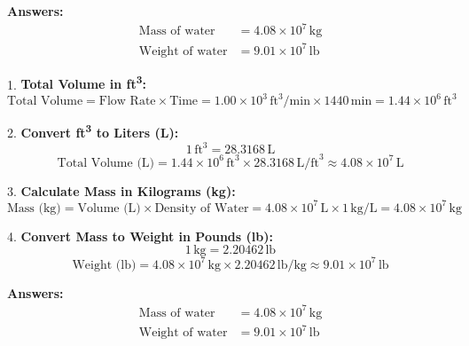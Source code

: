\documentclass[11pt]{article}
\begin{document}
\textbf{Answers:}
\begin{align*}
\text{Mass of water} &= 4.08 \times 10^7 \, \text{kg} \\
\text{Weight of water} &= 9.01 \times 10^7 \, \text{lb}
\end{align*}


1. \textbf{Total Volume in ft\textsuperscript{3}:}
\[
\text{Total Volume} = \text{Flow Rate} \times \text{Time} = 1.00 \times 10^3 \, \text{ft}^3/\text{min} \times 1440 \, \text{min} = 1.44 \times 10^6 \, \text{ft}^3
\]

2. \textbf{Convert ft\textsuperscript{3} to Liters (L):}
\[
1 \, \text{ft}^3 = 28.3168 \, \text{L}
\]
\[
\text{Total Volume (L)} = 1.44 \times 10^6 \, \text{ft}^3 \times 28.3168 \, \text{L/ft}^3 \approx 4.08 \times 10^7 \, \text{L}
\]

3. \textbf{Calculate Mass in Kilograms (kg):}
\[
\text{Mass (kg)} = \text{Volume (L)} \times \text{Density of Water} = 4.08 \times 10^7 \, \text{L} \times 1 \, \text{kg/L} = 4.08 \times 10^7 \, \text{kg}
\]

4. \textbf{Convert Mass to Weight in Pounds (lb):}
\[
1 \, \text{kg} = 2.20462 \, \text{lb}
\]
\[
\text{Weight (lb)} = 4.08 \times 10^7 \, \text{kg} \times 2.20462 \, \text{lb/kg} \approx 9.01 \times 10^7 \, \text{lb}
\]

\textbf{Answers:}
\begin{align*}
\text{Mass of water} &= 4.08 \times 10^7 \, \text{kg} \\
\text{Weight of water} &= 9.01 \times 10^7 \, \text{lb}
\end{align*}
\end{document}
